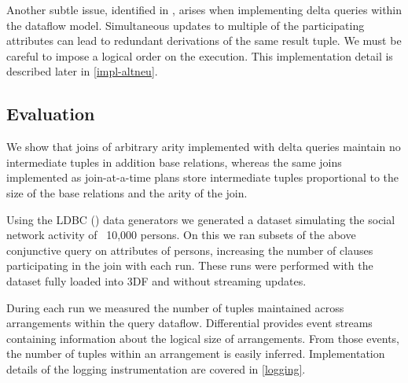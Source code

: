 \documentclass[../catalog.tex]{subfiles}
\begin{document}
Another subtle issue, identified in \cite{dogsdogsdogs}, arises when
implementing delta queries within the dataflow model. Simultaneous
updates to multiple of the participating attributes can lead to
redundant derivations of the same result tuple. We must be careful to
impose a logical order on the execution. This implementation detail is
described later in \autoref{impl-altneu}.

\subsection{Evaluation}

We show that joins of arbitrary arity implemented with delta queries
maintain no intermediate tuples in addition base relations, whereas
the same joins implemented as join-at-a-time plans store intermediate
tuples proportional to the size of the base relations and the arity of
the join.

Using the LDBC (\cite{erling2015ldbc}) data generators we generated a
dataset simulating the social network activity of ~10,000 persons. On
this we ran subsets of the above conjunctive query on attributes of
persons, increasing the number of clauses participating in the join
with each run. These runs were performed with the dataset fully loaded
into 3DF and without streaming updates.

During each run we measured the number of tuples maintained across
arrangements within the query dataflow. Differential provides event
streams containing information about the logical size of
arrangements. From those events, the number of tuples within an
arrangement is easily inferred. Implementation details of the logging
instrumentation are covered in \autoref{logging}.
\end{document}
